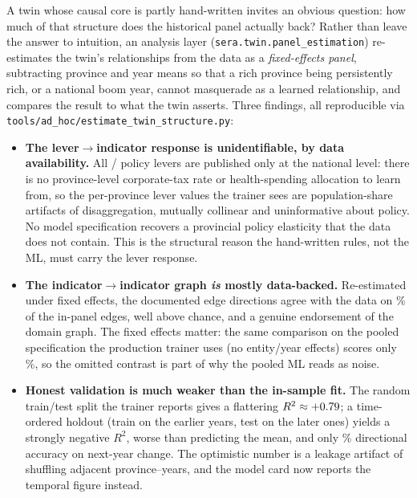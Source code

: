 \documentclass[11pt,a4paper]{article}
\newcommand{\code}[1]{\texttt{#1}}
\begin{document}
A twin whose causal core is partly hand-written invites an obvious question:
how much of that structure does the historical panel actually back? Rather than
leave the answer to intuition, an analysis layer
(\code{sera.twin.panel\_estimation}) re-estimates the twin's relationships from
the data as a \emph{fixed-effects panel}, subtracting province and year means
so that a rich province being persistently rich, or a national boom year, cannot
masquerade as a learned relationship, and compares the result to what the
twin asserts. Three findings, all reproducible via
\code{tools/ad\_hoc/estimate\_twin\_structure.py}:

\begin{itemize}
    \item \textbf{The lever$\to$indicator response is unidentifiable, by data
    availability.} All \strLevers{}/\strLevers{} policy levers are published only
    at the national level: there is no province-level corporate-tax rate or
    health-spending allocation to learn from, so the per-province lever values
    the trainer sees are population-share artifacts of disaggregation, mutually
    collinear and uninformative about policy. No model specification recovers a
    provincial policy elasticity that the data does not contain. This is the
    structural reason the hand-written rules, not the ML, must carry the lever
    response.
    \item \textbf{The indicator$\to$indicator graph \emph{is} mostly
    data-backed.} Re-estimated under fixed effects, the documented edge
    directions agree with the data on \strSignAgreeFE\% of the \strEdgesScored{}
    in-panel edges, well above chance, and a genuine endorsement of the
    domain graph. The fixed effects matter: the same comparison on the pooled
    specification the production trainer uses (no entity/year effects) scores
    only \strSignAgreePooled\%, so the omitted contrast is part of why the
    pooled ML reads as noise.
    \item \textbf{Honest validation is much weaker than the in-sample fit.} The
    random train/test split the trainer reports gives a flattering
    $R^2 \approx +0.79{}$; a time-ordered holdout (train on the earlier
    years, test on the later ones) yields a strongly negative $R^2$, worse
    than predicting the mean, and only \strDirAcc\% directional accuracy on
    next-year change. The optimistic number is a leakage artifact of shuffling
    adjacent province--years, and the model card now reports the temporal figure
    instead.
\end{itemize}
\end{document}
